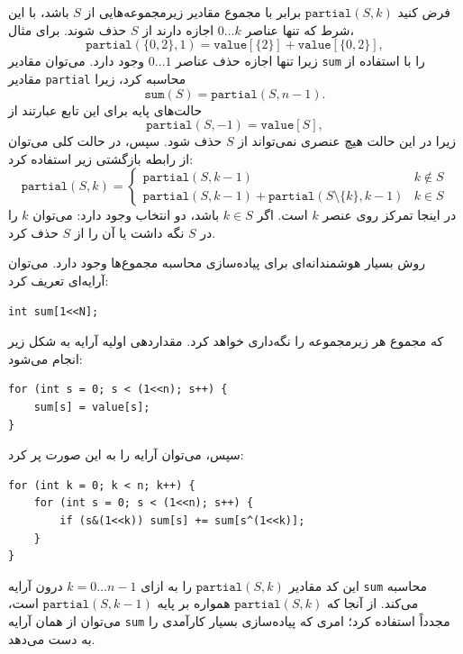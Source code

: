 فرض کنید $\texttt{partial}(S,k)$ برابر با مجموع مقادیر زیرمجموعه‌هایی از $S$ باشد، با این شرط که تنها عناصر $0 \ldots k$ اجازه دارند از $S$ حذف شوند.
برای مثال،
\[\texttt{partial}(\{0,2\},1)=\texttt{value}[\{2\}]+\texttt{value}[\{0,2\}],\]
زیرا تنها اجازه حذف عناصر $0 \ldots 1$ وجود دارد.
می‌توان مقادیر \texttt{sum} را با استفاده از مقادیر \texttt{partial} محاسبه کرد، زیرا
\[\texttt{sum}(S) = \texttt{partial}(S,n-1).\]
حالت‌های پایه برای این تابع عبارتند از
\[\texttt{partial}(S,-1)=\texttt{value}[S],\]
زیرا در این حالت هیچ عنصری نمی‌تواند از $S$ حذف شود.
سپس، در حالت کلی می‌توان از رابطه بازگشتی زیر استفاده کرد:
\begin{equation*}
    \texttt{partial}(S,k) = \begin{cases}
               \texttt{partial}(S,k-1) & k \notin S \\
               \texttt{partial}(S,k-1) + \texttt{partial}(S \setminus \{k\},k-1) & k \in S
           \end{cases}
\end{equation*}
در اینجا تمرکز روی عنصر $k$ است.
اگر $k \in S$ باشد، دو انتخاب وجود دارد: می‌توان $k$ را در $S$ نگه داشت یا آن را از $S$ حذف کرد.

روش بسیار هوشمندانه‌ای برای پیاده‌سازی محاسبه مجموع‌ها وجود دارد. می‌توان آرایه‌ای تعریف کرد:
\begin{lstlisting}
int sum[1<<N];
\end{lstlisting}
که مجموع هر زیرمجموعه را نگه‌داری خواهد کرد.
مقداردهی اولیه آرایه به شکل زیر انجام می‌شود:
\begin{lstlisting}
for (int s = 0; s < (1<<n); s++) {
    sum[s] = value[s];
}
\end{lstlisting}
سپس، می‌توان آرایه را به این صورت پر کرد:
\begin{lstlisting}
for (int k = 0; k < n; k++) {
    for (int s = 0; s < (1<<n); s++) {
        if (s&(1<<k)) sum[s] += sum[s^(1<<k)];
    }
}
\end{lstlisting}
این کد مقادیر $\texttt{partial}(S,k)$ را به ازای $k=0 \ldots n-1$ درون آرایه \texttt{sum} محاسبه می‌کند.
از آنجا که $\texttt{partial}(S,k)$ همواره بر پایه $\texttt{partial}(S,k-1)$ است، می‌توان از همان آرایه \texttt{sum} مجدداً استفاده کرد؛ امری که پیاده‌سازی بسیار کارآمدی را به دست می‌دهد.